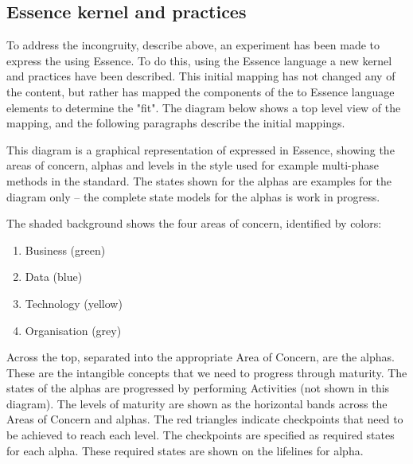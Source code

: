 \subsection{ Essence kernel and practices}\label{subsec:kg-mm-essence-kernel-and-practices}

To address the incongruity, describe above, an experiment has been made to express the 
using Essence.
To do this, using the Essence language a new kernel and practices have been described.
This initial mapping has not changed any of the content, but rather has mapped the components of
the  to Essence language elements to determine the "fit".
The diagram below shows a top level view of the mapping, and the following paragraphs describe the initial mappings.


This diagram is a graphical representation of  expressed in Essence, showing the areas of concern,
alphas and levels in the style used for example multi-phase methods in the  standard.
The states shown for the alphas are examples for the diagram only -- the complete state models for the alphas
is work in progress.

The shaded background shows the four areas of concern, identified by colors:

\begin{enumerate}
    \item Business (green)
    \item Data (blue)
    \item Technology (yellow)
    \item Organisation (grey)
\end{enumerate}

Across the top, separated into the appropriate Area of Concern, are the alphas.
These are the intangible concepts that we need to progress through maturity.
The states of the alphas are progressed by performing Activities (not shown in this diagram).
The levels of maturity are shown as the horizontal bands across the Areas of Concern and alphas.
The red triangles indicate checkpoints that need to be achieved to reach each level.
The checkpoints are specified as required states for each alpha.
These required states are shown on the lifelines for alpha.

